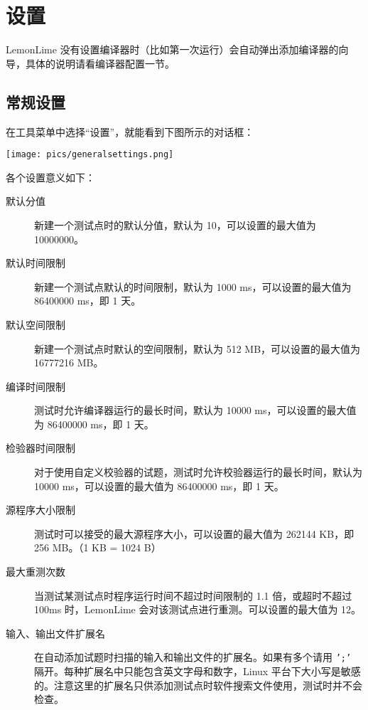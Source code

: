 \documentclass[UTF-8]{ctexart}
\begin{document}
    \newpage

    \section{设置}

    LemonLime 没有设置编译器时（比如第一次运行）会自动弹出添加编译器的向导，具体的说明请看编译器配置一节。

    \subsection{常规设置}

    在工具菜单中选择“设置”，就能看到下图所示的对话框：

    \begin{center}
        \texttt{[image: pics/generalsettings.png]}
    \end{center}

    各个设置意义如下：

    \begin{description}
        \item[默认分值] 新建一个测试点时的默认分值，默认为 10，可以设置的最大值为 10000000。
        \item[默认时间限制] 新建一个测试点默认的时间限制，默认为 1000 ms，可以设置的最大值为 86400000 ms，即 1 天。
        \item[默认空间限制] 新建一个测试点时默认的空间限制，默认为 512 MB，可以设置的最大值为 16777216 MB。
        \item[编译时间限制] 测试时允许编译器运行的最长时间，默认为 10000 ms，可以设置的最大值为 86400000 ms，即 1 天。
        \item[检验器时间限制] 对于使用自定义校验器的试题，测试时允许校验器运行的最长时间，默认为 10000 ms，可以设置的最大值为 86400000 ms，即 1 天。
        \item[源程序大小限制] 测试时可以接受的最大源程序大小，可以设置的最大值为 262144 KB，即 256 MB。（1 KB = 1024 B）
        \item[最大重测次数] 当测试某测试点时程序运行时间不超过时间限制的 1.1 倍，或超时不超过 100ms 时，LemonLime 会对该测试点进行重测。可以设置的最大值为 12。
        \item[输入、输出文件扩展名]  在自动添加试题时扫描的输入和输出文件的扩展名。如果有多个请用 \texttt{';'} 隔开。每种扩展名中只能包含英文字母和数字，Linux 平台下大小写是敏感的。注意这里的扩展名只供添加测试点时软件搜索文件使用，测试时并不会检查。
    \end{description}
\end{document}
